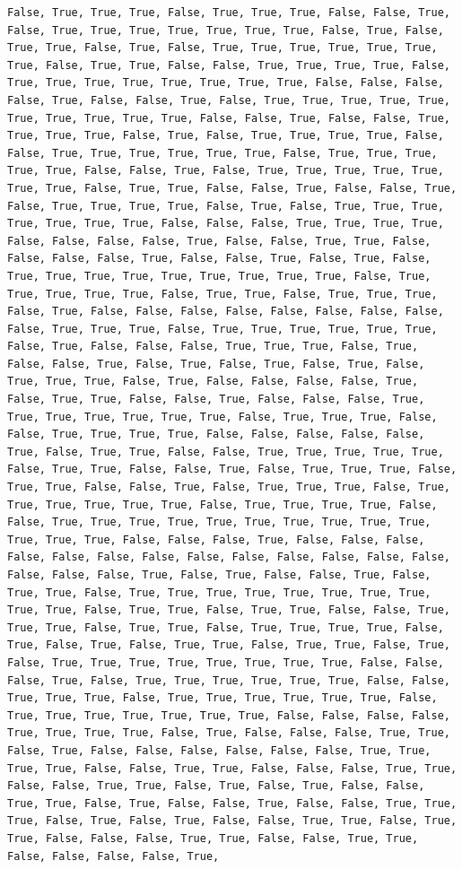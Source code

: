 \documentclass[
  letterpaper,
  DIV=11,
  numbers=noendperiod]{scrartcl}
\begin{document}
\begin{verbatim}
False, True, True, True, False, True, True, True, False, False, True, False, True, True, True, True, True, True, True, False, True, False, True, True, False, True, False, True, True, True, True, True, True, True, False, True, True, False, False, True, True, True, True, False, True, True, True, True, True, True, True, True, False, False, False, False, True, False, False, True, False, True, True, True, True, True, True, True, True, True, True, False, False, True, False, False, True, True, True, True, False, True, False, True, True, True, True, False, False, True, True, True, True, True, True, False, True, True, True, True, True, False, False, True, False, True, True, True, True, True, True, True, False, True, True, False, False, True, False, False, True, False, True, True, True, True, False, True, False, True, True, True, True, True, True, True, False, False, False, True, True, True, True, False, False, False, False, True, False, False, True, True, False, False, False, False, True, False, False, True, False, True, False, True, True, True, True, True, True, True, True, True, False, True, True, True, True, True, False, True, True, False, True, True, True, False, True, False, False, False, False, False, False, False, False, False, True, True, True, False, True, True, True, True, True, True, False, True, False, False, False, True, True, True, False, True, False, False, True, False, True, False, True, False, True, False, True, True, True, False, True, False, False, False, False, True, False, True, True, False, False, True, False, False, False, True, True, True, True, True, True, True, False, True, True, True, False, False, True, True, True, True, False, False, False, False, False, True, False, True, True, False, False, True, True, True, True, True, False, True, True, False, False, True, False, True, True, True, False, True, True, False, False, True, False, True, True, True, False, True, True, True, True, True, True, False, True, True, True, True, False, False, True, True, True, True, True, True, True, True, True, True, True, True, True, False, False, False, True, False, False, False, False, False, False, False, False, False, False, False, False, False, False, False, False, True, False, True, False, False, True, False, True, True, False, True, True, True, True, True, True, True, True, True, True, False, True, True, False, True, True, False, False, True, True, True, False, True, True, False, True, True, True, True, False, True, False, True, False, True, True, False, True, True, False, True, False, True, True, True, True, True, True, True, True, False, False, False, True, False, True, True, True, True, True, True, False, False, True, True, True, False, True, True, True, True, True, True, False, True, True, True, True, True, True, True, False, False, False, False, True, True, True, True, False, True, False, False, False, True, True, False, True, False, False, False, False, False, False, True, True, True, True, False, False, True, True, False, False, False, True, True, False, False, True, True, False, True, False, True, False, False, True, True, False, True, False, False, True, False, False, True, True, True, False, True, False, True, False, False, True, True, False, True, True, False, False, False, True, True, False, False, True, True, False, False, False, False, True, 
\end{verbatim}
\end{document}
